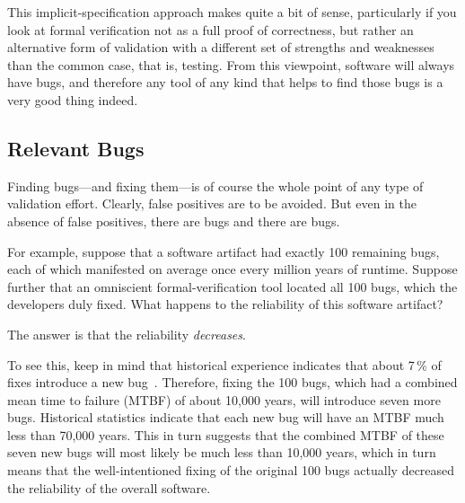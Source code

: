 This implicit-specification approach makes quite a bit of sense, particularly
if you look at formal verification not as a full proof of correctness,
but rather an alternative form of validation with a different set of
strengths and weaknesses than the common case, that is, testing.
From this viewpoint, software will always have bugs, and therefore any
tool of any kind that helps to find those bugs is a very good thing
indeed.

\subsection{Relevant Bugs}
\label{sec:future:Relevant Bugs}

Finding bugs---and fixing them---is of course the whole point of any
type of validation effort.
Clearly, false positives are to be avoided.
But even in the absence of false positives, there are bugs and there are bugs.

For example, suppose that a software artifact had exactly 100 remaining
bugs, each of which manifested on average once every million years
of runtime.
Suppose further that an omniscient formal-verification tool located
all 100 bugs, which the developers duly fixed.
What happens to the reliability of this software artifact?

The answer is that the reliability \emph{decreases}.

To see this, keep in mind that historical experience indicates that
about 7\,\% of fixes introduce a new bug~\cite{RexBlack2012SQA}.
Therefore, fixing the 100 bugs, which had a combined mean time to failure
(MTBF) of about 10,000 years, will introduce seven more bugs.
Historical statistics indicate that each new bug will have an MTBF
much less than 70,000 years.
This in turn suggests that the combined MTBF of these seven new bugs
will most likely be much less than 10,000 years, which in turn means
that the well-intentioned fixing of the original 100 bugs actually
decreased the reliability of the overall software.

